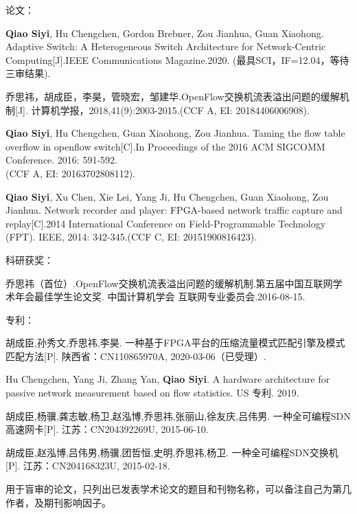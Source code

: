 
{}




\noindent 论文：
\begin{publist}
	\item \textbf{Qiao Siyi}, Hu Chengchen, Gordon Brebner, Zou Jianhua, Guan Xiaohong. Adaptive Switch: A Heterogeneous Switch Architecture for Network-Centric Computing[J].IEEE Communications Magazine.2020.
	(最具SCI，IF=12.04，等待三审结果).
	\item {\hei 乔思祎}，胡成臣，李昊，管晓宏，邹建华.OpenFlow交换机流表溢出问题的缓解机制[J]. 计算机学报，2018,41(9):2003-2015.(CCF A, EI: 20184406006908).
	\item \textbf{Qiao Siyi}, Hu Chengchen, Guan Xiaohong, Zou Jianhua. Taming the flow table overflow in openflow switch[C].In Proceedings of the 2016 ACM SIGCOMM Conference. 2016: 591-592.\\
	(CCF A, EI: 20163702808112).
	\item \textbf{Qiao Siyi}, Xu Chen, Xie Lei, Yang Ji, Hu Chengchen, Guan Xiaohong, Zou Jianhua. Network recorder and player: FPGA-based network traffic capture and replay[C].2014 International Conference on Field-Programmable Technology (FPT). IEEE, 2014: 342-345.(CCF C, EI: 20151900816423).
\end{publist}

\noindent 科研获奖：
\begin{publist}
	\item {\hei 乔思祎}（首位）.OpenFlow交换机流表溢出问题的缓解机制.第五届中国互联网学术年会最佳学生论文奖. 中国计算机学会 互联网专业委员会.2016-08-15.
\end{publist}

\noindent 专利：
\begin{publist}
	
	\item 胡成臣,孙秀文,{\hei 乔思祎},李昊. 一种基于FPGA平台的压缩流量模式匹配引擎及模式匹配方法[P]. 陕西省：CN110865970A, 2020-03-06（已受理）.
	\item Hu Chengchen, Yang Ji, Zhang Yan, \textbf{Qiao Siyi}. A hardware architecture for passive network measurement based on flow statistics. US 专利. 2019.
	\item 胡成臣,杨骥,龚志敏,杨卫,赵泓博,{\hei 乔思祎},张丽山,徐友庆,吕伟男. 一种全可编程SDN高速网卡[P]. 江苏：CN204392269U, 2015-06-10. 
	\item 胡成臣,赵泓博,吕伟男,杨骥,团哲恒,史明,{\hei 乔思祎},杨卫. 一种全可编程SDN交换机[P]. 江苏：CN204168323U, 2015-02-18.
\end{publist}






\vspace{\baselineskip}
{\color{red} 用于盲审的论文，只列出已发表学术论文的题目和刊物名称，可以备注自己为第几作者，及期刊影响因子。}

\clearpage{\pagestyle{empty}\cleardoublepage}%
